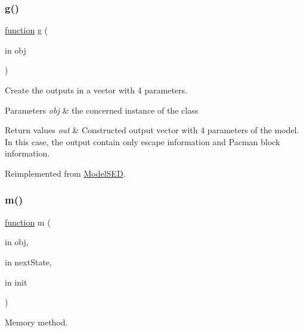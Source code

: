\subsubsection{\texorpdfstring{g()}{g()}}
{\footnotesize\ttfamily \hyperlink{_plan__desuma_functions_8m_ac2ffb26d6f42d3bbcd7847b0873403f4}{function} g (\begin{DoxyParamCaption}\item[{in}]{obj }\end{DoxyParamCaption})\hspace{0.3cm}{\ttfamily [virtual]}}



Create the outputs in a vector with 4 parameters. 


\begin{DoxyParams}{Parameters}
{\em obj} & the concerned instance of the class \\
\hline
\end{DoxyParams}

\begin{DoxyRetVals}{Return values}
{\em out} & Constructed output vector with 4 parameters of the model. In this case, the output contain only escape information and Pacman block information. \\
\hline
\end{DoxyRetVals}


Reimplemented from \hyperlink{class_model_s_e_d_ac6bf71081e35755d5ed9992d165afcb8}{Model\+S\+ED}.

\mbox{\label{class_stop_condition_a3140f24c6c4b80037b7d4f521c6ae2d3}} 
\subsubsection{\texorpdfstring{m()}{m()}}
{\footnotesize\ttfamily \hyperlink{_plan__desuma_functions_8m_ac2ffb26d6f42d3bbcd7847b0873403f4}{function} m (\begin{DoxyParamCaption}\item[{in}]{obj,  }\item[{in}]{next\+State,  }\item[{in}]{init }\end{DoxyParamCaption})\hspace{0.3cm}{\ttfamily [virtual]}}



Memory method. 

